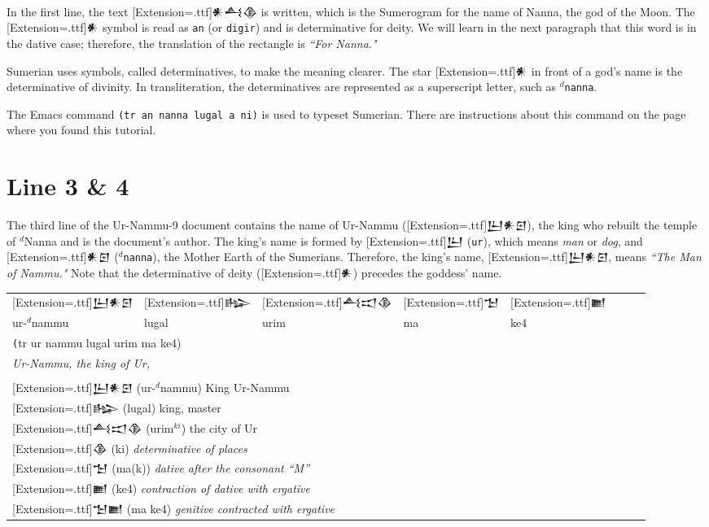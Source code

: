\documentclass[a4paper,12pt]{book}
\newcommand{\fcn}{\setmainfont{Akkadian}[Extension=.ttf]}
\begin{document}
\verb||\\
 In the first line,
the text {\fcn 𒀭𒋀𒆠} is written, which is
the Sumerogram for the name of Nanna, the god of the Moon.
The {\fcn 𒀭} symbol is read as \verb|an|
(or \verb|digir|) and is determinative for deity.
We will learn in the next paragraph that this word
is in the dative case; therefore, the translation
of the rectangle is {\em ``For Nanna."}

Sumerian uses symbols, called determinatives,
to make the meaning clearer. The star {\fcn 𒀭}
in front of a god's name is the determinative
of divinity. In transliteration, the determinatives
are represented as a superscript letter, such
as $^d$\verb|nanna|.

The Emacs command \verb|(tr an nanna lugal a ni)| is used
to typeset Sumerian. There are instructions about
this command on the page where you found this tutorial.

\section{Line 3 \& 4}
The third line of the Ur-Nammu-9 document contains the name of
Ur-Nammu ({\fcn 𒌨𒀭𒇉}), the king who rebuilt the temple
of $^d$Nanna and is the document's author.
The king's name is formed by {\fcn 𒌨} (\verb|ur|),
which means {\em man} or {\em dog},
and {\fcn 𒀭𒇉} ($^d$\verb|nanna|),
the Mother Earth of the Sumerians.
Therefore, the king's name, {\fcn 𒌨𒀭𒇉},
means {\em ``The Man of Nammu."}
Note that the determinative of
deity ({\fcn 𒀭}) precedes the goddess' name.\\

\begin{tabular}[!h]{l l l l l l l l}
\fcn\Large 𒌨𒀭𒇉
&\fcn\Large 𒈗 &\fcn\Large 𒋀𒀊𒆠 &
\fcn\Large 𒈠 & \fcn\Large 𒆤\\
  ur-$^d$nammu & lugal & urim & ma & ke4\\
\multicolumn{5}{l}{\texttt (tr ur nammu lugal urim ma ke4)}\\
\multicolumn{5}{l}{\em Ur-Nammu, the king of Ur,}\\
\hline\\
\multicolumn{5}{l}{{\fcn 𒌨𒀭𒇉}
                    (ur-$^d$nammu) King Ur-Nammu}\\
\multicolumn{5}{l}{{\fcn 𒈗}
                    (lugal) king, master }\\
\multicolumn{5}{l}{{\fcn 𒋀𒀊𒆠}
                    (urim$^{ki}$) the city of Ur }\\
\multicolumn{5}{l}{{\fcn 𒆠}
     (ki) {\em determinative of places} }\\
\multicolumn{5}{l}{{\fcn 𒈠}
     (ma(k)) {\em dative after the consonant ``M''} }\\
\multicolumn{5}{l}{{\fcn 𒆤}
     (ke4) {\em contraction of dative with ergative} }\\
\multicolumn{5}{l}{{\fcn 𒈠𒆤}
     (ma ke4) {\em genitive contracted with ergative} }\\
\end{tabular} 
\end{document}
